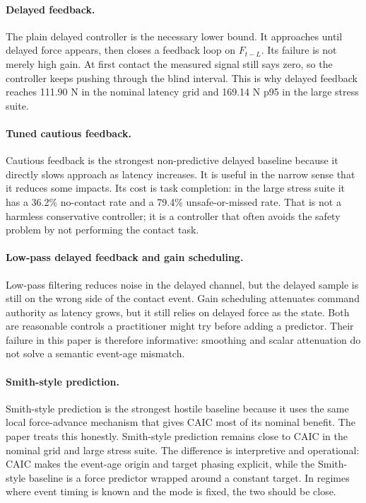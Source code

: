 \documentclass{article}
\newcommand{\lat}{L}
\newcommand{\force}{F}
\newcommand{\caic}{CAIC}
\begin{document}
\paragraph{Delayed feedback.}
The plain delayed controller is the necessary lower bound. It approaches until delayed force appears, then closes a feedback loop on $\force_{t-\lat}$. Its failure is not merely high gain. At first contact the measured signal still says zero, so the controller keeps pushing through the blind interval. This is why delayed feedback reaches 111.90 N in the nominal latency grid and 169.14 N p95 in the large stress suite.

\paragraph{Tuned cautious feedback.}
Cautious feedback is the strongest non-predictive delayed baseline because it directly slows approach as latency increases. It is useful in the narrow sense that it reduces some impacts. Its cost is task completion: in the large stress suite it has a 36.2\% no-contact rate and a 79.4\% unsafe-or-missed rate. That is not a harmless conservative controller; it is a controller that often avoids the safety problem by not performing the contact task.

\paragraph{Low-pass delayed feedback and gain scheduling.}
Low-pass filtering reduces noise in the delayed channel, but the delayed sample is still on the wrong side of the contact event. Gain scheduling attenuates command authority as latency grows, but it still relies on delayed force as the state. Both are reasonable controls a practitioner might try before adding a predictor. Their failure in this paper is therefore informative: smoothing and scalar attenuation do not solve a semantic event-age mismatch.

\paragraph{Smith-style prediction.}
Smith-style prediction is the strongest hostile baseline because it uses the same local force-advance mechanism that gives \caic{} most of its nominal benefit. The paper treats this honestly. Smith-style prediction remains close to \caic{} in the nominal grid and large stress suite. The difference is interpretive and operational: \caic{} makes the event-age origin and target phasing explicit, while the Smith-style baseline is a force predictor wrapped around a constant target. In regimes where event timing is known and the mode is fixed, the two should be close.
\end{document}
